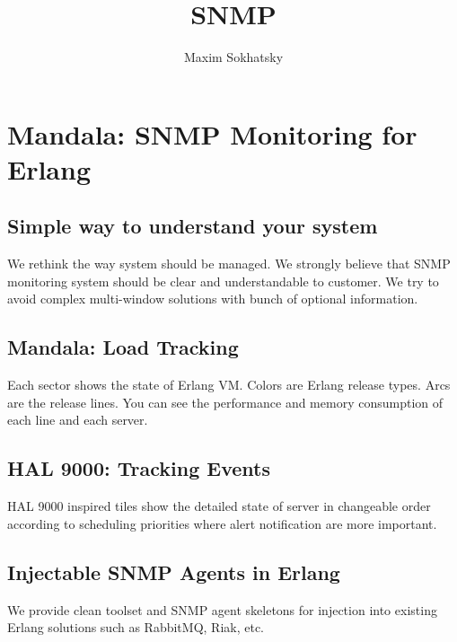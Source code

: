 



\title{SNMP}
\author{Maxim Sokhatsky}

\paragraph{}
\section*{Mandala: SNMP Monitoring for Erlang}
\subsection*{Simple way to understand your system}
We rethink the way system should be managed. We strongly believe that
SNMP monitoring system should be clear and understandable to customer.
We try to avoid complex multi-window solutions with bunch of optional information.

\subsection*{Mandala: Load Tracking}

Each sector shows the state of Erlang VM. Colors are Erlang release types.
Arcs are the release lines. You can see the performance and memory
consumption of each line and each server.

\subsection*{HAL 9000: Tracking Events}

HAL 9000 inspired tiles show the detailed state of server in changeable
order according to scheduling priorities where alert notification are more
important.

\subsection*{Injectable SNMP Agents in Erlang}
We provide clean toolset and SNMP agent skeletons for injection into existing Erlang
solutions such as RabbitMQ, Riak, etc.

